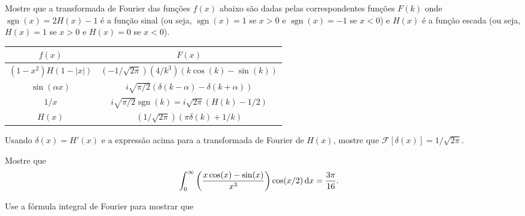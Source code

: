 \documentclass[a4paper,12pt, leqno, answers]{exam}
\DeclareMathOperator{\sgn}{sgn}
\begin{document}
\thispagestyle{empty}

\newpage
\setcounter{page}{1}
\begin{questions}
    \question Mostre que a transformada de Fourier das fun\c{c}\~{o}es $f(x)$
    abaixo s\~{a}o dadas pelas correspondentes fun\c{c}\~{o}es $F(k)$ onde
    $\sgn(x) = 2 H(x) - 1$ \'{e} a fun\c{c}\~{a}o sinal (ou seja, $\sgn(x) = 1$
    se $x > 0$ e $\sgn(x) = -1$ se $x < 0$) e $H(x)$ \'{e} a fun\c{c}\~{a}o
    escada (ou seja, $H(x) = 1$ se $x > 0$ e $H(x) = 0$ se $x < 0$).
    \begin{center}
        \begin{tabular}{|c|c|}
            \hline
            $f(x)$ & $F(x)$ \\ \hline
            $(1 - x^2) H(1 - |x|)$ & $\left( -1 / \sqrt{2 \pi} \right) \left(
            4 / k^3 \right) \left( k \cos(k) - \sin(k) \right)$ \\ \hline
            $\sin\left( \alpha x \right)$ & $i \sqrt{\pi / 2} \left( \delta(k -
            \alpha) - \delta(k + \alpha) \right)$ \\ \hline
            $1 / x$ & $i \sqrt{\pi/2} \sgn(k) = i \sqrt{2 \pi} \left( H(k) - 1/2
            \right)$ \\ \hline
            $H(x)$ & $ \left( 1 / \sqrt{2 \pi} \right) \left( \pi \delta(k) + 1
            / k \right)$ \\ \hline
        \end{tabular}
    \end{center}
    \begin{solution}
    \end{solution}

    \question Usando $\delta(x) = H'(x)$ e a express\~{a}o acima para a
    transformada de Fourier de $H(x)$, mostre que $\mathcal{F}[\delta(x)] = 1 /
    \sqrt{2 \pi}$.
    \begin{solution}
    \end{solution}

    \question Mostre que
    \begin{align*}
        \int_0^\infty \left( \frac{x \cos(x) - \sin(x)}{x^3} \right) \cos(x/2)
        \, \mathrm{d}x &= \frac{3 \pi}{16}.
    \end{align*}
    \begin{solution}
    \end{solution}

    \question Use a f\'{o}rmula integral de Fourier para mostrar que
    \begin{parts}

\end{parts}
\end{questions}
\end{document}
